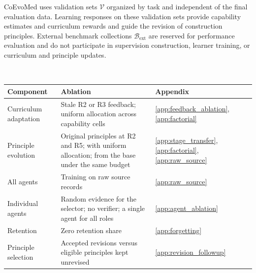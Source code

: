 CoEvoMed uses validation sets $\mathcal V$ organized by task and independent of the final evaluation data. Learning responses on these validation sets provide capability estimates and curriculum rewards and guide the revision of construction principles. External benchmark collections $\mathcal B_{\mathrm{ext}}$ are reserved for performance evaluation and do not participate in supervision construction, learner training, or curriculum and principle updates.


\section{}
\label{app:mechanisms}


\begin{table}[H]
\centering\small\color{blue}
\revtablenumber
\caption{}
\label{tab:ablation_map}
\setlength{\tabcolsep}{4pt}
\renewcommand{\arraystretch}{1.12}
\begin{tabularx}{\linewidth}{@{}lYl@{}}
\toprule
Component & Ablation & Appendix\\
\midrule
Curriculum adaptation & Stale R2 or R3 feedback; uniform allocation across capability cells & \ref{app:feedback_ablation}, \ref{app:factorial}\\
Principle evolution & Original principles at R2 and R5; with uniform allocation; from the base under the same budget & \ref{app:stage_transfer}, \ref{app:factorial}, \ref{app:raw_source}\\
All agents & Training on raw source records & \ref{app:raw_source}\\
Individual agents & Random evidence for the selector; no verifier; a single agent for all roles & \ref{app:agent_ablation}\\
Retention & Zero retention share & \ref{app:forgetting}\\
Principle selection & Accepted revisions versus eligible principles kept unrevised & \ref{app:revision_followup}\\
\bottomrule
\end{tabularx}
\end{table}

